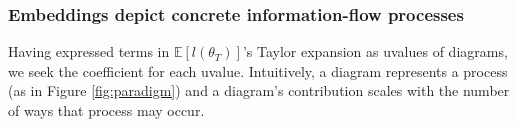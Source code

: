 \documentclass[anon,12pt]{colt2021} %
\newcommand{\expc}{\mathbb{E}}
\begin{document}
            \subsubsection{Embeddings depict concrete information-flow processes}\label{sect:embeddings}
            Having expressed terms in $\expc[l(\theta_T)]$'s Taylor expansion %
            as uvalues of
            diagrams, we seek the coefficient for each uvalue.  Intuitively, a
            diagram represents a process (as in Figure \ref{fig:paradigm}) and
            a diagram's contribution scales with the number of ways that
            process may occur.
\end{document}
